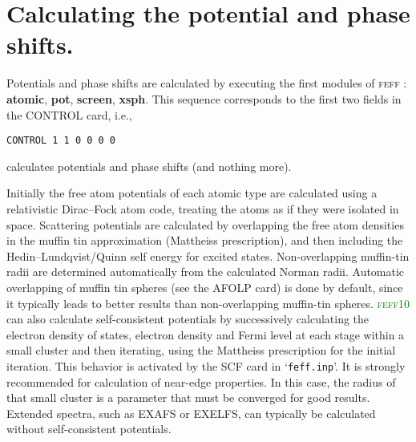 \documentclass[11pt,oneside]{report} %
\newcommand{\feffcurrent}{\textsc{feff10}}
\newcommand{\program}[1]{\textsc{#1}}
\newcommand{\feff}{\program{feff}}
\newcommand{\file}[1]{`\texttt{#1}'}
\newcommand{\module}[1]{\textrm{\bf{#1}}}
\begin{document}
%


\section{Calculating the potential and phase shifts.}
\label{sec:calcpots}
Potentials and phase shifts are calculated by executing the first modules of
{\feff} : \module{atomic}, \module{pot}, \module{screen}, \module{xsph}.  This
sequence corresponds to the first two fields in the CONTROL card, i.e.,
\begin{verbatim}
CONTROL 1 1 0 0 0 0 
\end{verbatim}
calculates potentials and phase shifts (and nothing more).  

Initially the free atom potentials of each atomic type are calculated
using a relativistic Dirac--Fock atom code, treating the atoms as if
they were isolated in space. Scattering potentials are
calculated by overlapping the free atom densities in the muffin tin
approximation (Mattheiss prescription), and then including the
Hedin--Lundqvist/Quinn self energy for excited states. 
Non-overlapping muffin-tin radii are determined automatically from
the calculated Norman radii. Automatic overlapping of muffin tin
spheres (see the AFOLP card) is done by default, since it typically
leads to better results than non-overlapping muffin-tin spheres.
\textcolor{green}{\feffcurrent} can also calculate self-consistent potentials by successively
calculating the electron density of states, electron density and Fermi
level at each stage within a small cluster and then iterating, using
the Mattheiss prescription for the initial iteration.  This behavior is activated by the SCF card in \file{feff.inp}.  
It is strongly recommended for calculation of near-edge properties.  In this case, the radius
of that small cluster is a parameter that must be converged for good results.  Extended spectra, such as EXAFS or EXELFS,
can typically be calculated without self-consistent potentials.
\end{document}
